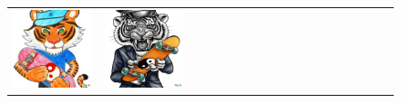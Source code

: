 \begin{figure}[ht!]
\begin{adjustwidth}{-0.8in}{-0.5in}
\begin{tabular}{cccccccccccccccccccc}
\multicolumn{2}{c}{\includegraphics[width=\threebythreecolwidth\textwidth]{figures/cherries/tiger7.jpg}} &
\multicolumn{2}{c}{\includegraphics[width=\threebythreecolwidth\textwidth]{figures/cherries/tiger8.jpg}} &

\end{tabular}
\end{adjustwidth}
\end{figure}
